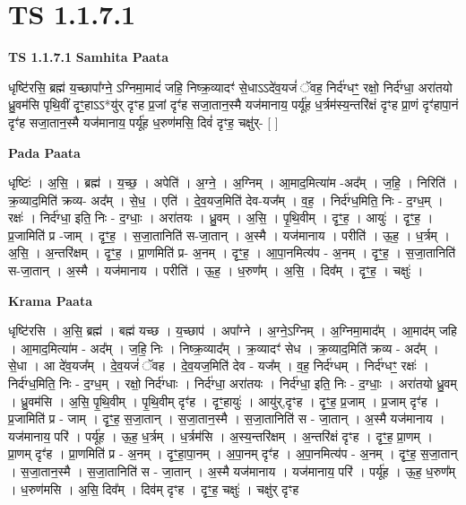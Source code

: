 \documentclass[17pt]{extarticle}
\begin{document}
\section*{ TS 1.1.7.1 }

\textbf{TS 1.1.7.1 } \newline
\textbf{Samhita Paata} \newline

धृष्टि॑रसि॒ ब्रह्म॑ य॒च्छापा᳚ग्ने॒ ऽग्निमा॒मादं॑ जहि॒ निष्क्र॒व्यादꣳ॑ से॒धाऽऽदे॑व॒यजं॑ ॅवह॒ निर्द॑ग्धꣳ॒॒ रक्षो॒ निर्द॑ग्धा॒ अरा॑तयो ध्रु॒वम॑सि पृथि॒वीं दृꣳ॒॒हाऽऽ*यु॑र् दृꣳह प्र॒जां दृꣳ॑ह सजा॒तान॒स्मै यज॑मानाय॒ पर्यू॑ह ध॒र्त्रम॑स्य॒न्तरि॑क्षं दृꣳह प्रा॒णं दृꣳ॑हापा॒नं दृꣳ॑ह सजा॒तान॒स्मै यज॑मानाय॒ पर्यू॑ह ध॒रुण॑मसि॒ दिवं॑ दृꣳह॒ चक्षु॑र्- [ ] \newline

\textbf{Pada Paata} \newline

धृष्टिः॑ । अ॒सि॒ । ब्रह्म॑ । य॒च्छ॒ । अपेति॑ । अ॒ग्ने॒ । अ॒ग्निम् । आ॒माद॒मित्या॑म -अद᳚म् । ज॒हि॒ । निरिति॑ । क्र॒व्याद॒मिति॑ क्रव्य- अद᳚म् । से॒ध॒ । एति॑ । दे॒व॒यज॒मिति॑ देव-यज᳚म् । व॒ह॒ । निर्द॑ग्ध॒मिति॒ निः - द॒ग्ध॒म् । रक्षः॑ । निर्द॑ग्धा॒ इति॒ निः - द॒ग्धाः॒ । अरा॑तयः । ध्रु॒वम् । अ॒सि॒ । पृ॒थि॒वीम् । दृꣳ॒॒ह॒ । आयुः॑ । दृꣳ॒॒ह॒ । प्र॒जामिति॑ प्र -जाम् । दृꣳ॒॒ह॒ । स॒जा॒तानिति॑ स-जा॒तान् । अ॒स्मै । यज॑मानाय । परीति॑ । ऊ॒ह॒ । ध॒र्त्रम् । अ॒सि॒ । अ॒न्तरि॑क्षम् । दृꣳ॒॒ह॒ । प्रा॒णमिति॑ प्र- अ॒नम् । दृꣳ॒॒ह॒ । आ॒पा॒नमित्य॑प - अ॒नम् । दृꣳ॒॒ह॒ । स॒जा॒तानिति॑ स-जा॒तान् । अ॒स्मै । यज॑मानाय । परीति॑ । ऊ॒ह॒ । ध॒रुण᳚म् । अ॒सि॒ । दिव᳚म् । दृꣳ॒॒ह॒ । चक्षुः॑ ।  \newline


\textbf{Krama Paata} \newline

धृष्टि॑रसि । अ॒सि॒ ब्रह्म॑ । बह्म॑ यच्छ । य॒च्छाप॑ । अपा᳚ग्ने । अ॒ग्ने॒ऽग्निम् । अ॒ग्निमा॒माद᳚म् । आ॒माद॑म् जहि । आ॒माद॒मित्या॑म - अद᳚म् । ज॒हि॒ निः । निष्क्र॒व्याद᳚म् । क्र॒व्यादꣳ॑ सेध । क्र॒व्याद॒मिति॑ क्रव्य - अद᳚म् । से॒धा । आ दे॑व॒यज᳚म् । दे॒व॒यजं॑ ॅवह । दे॒व॒यज॒मिति॑ देव - यज᳚म् । व॒ह॒ निर्द॑ग्धम् । निर्द॑ग्धꣳ॒॒ रक्षः॑ । निर्द॑ग्ध॒मिति॒ निः - द॒ग्ध॒म् । रक्षो॒ निर्द॑ग्धाः । निर्द॑ग्धा॒ अरा॑तयः । निर्द॑ग्धा॒ इति॒ निः - द॒ग्धाः॒ । अरा॑तयो ध्रु॒वम् । ध्रु॒वम॑सि । अ॒सि॒ पृ॒थि॒वीम् । पृ॒थि॒वीम् दृꣳ॑ह । दृꣳ॒॒हायुः॑ । आयु॑र्,दृꣳह । दृꣳ॒॒ह॒ प्र॒जाम् । प्र॒जाम् दृꣳ॑ह । प्र॒जामिति॑ प्र - जाम् । दृꣳ॒॒ह॒ स॒जा॒तान् । स॒जा॒तान॒स्मै । स॒जा॒तानिति॑ स - जा॒तान् । अ॒स्मै यज॑मानाय । यज॑मानाय॒ परि॑ । पर्यू॑ह । ऊ॒ह॒ ध॒र्त्रम् । ध॒र्त्रम॑सि । अ॒स्य॒न्तरि॑क्षम् । अ॒न्तरि॑क्षं दृꣳह । दृꣳ॒॒ह॒ प्रा॒णम् । प्रा॒णम् दृꣳ॑ह । प्रा॒णमिति॑ प्र - अ॒नम् । दृꣳ॒॒हा॒पा॒नम् । अ॒पा॒नम् दृꣳ॑ह । अ॒पा॒नमित्य॑प - अ॒नम् । दृꣳ॒॒ह॒ स॒जा॒तान् । स॒जा॒तान॒स्मै । स॒जा॒तानिति॑ स - जा॒तान् । अ॒स्मै यज॑मानाय । यज॑मानाय॒ परि॑ । पर्यू॑ह । ऊ॒ह॒ ध॒रुण᳚म् । ध॒रुण॑मसि । अ॒सि॒ दिव᳚म् । दिव॑म् दृꣳह । दृꣳ॒॒ह॒ चक्षुः॑ । चक्षु॑र् दृꣳह \newline
\end{document}
